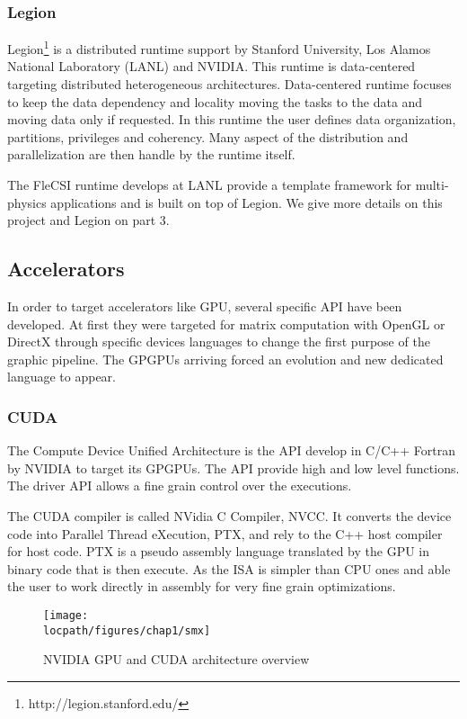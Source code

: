 \subsubsection{Legion}
Legion\footnote{http://legion.stanford.edu/} is a distributed runtime support by Stanford University, Los Alamos National Laboratory (LANL) and NVIDIA. 
This runtime is data-centered targeting distributed heterogeneous architectures. 
Data-centered runtime focuses to keep the data dependency and locality moving the tasks to the data and moving data only if requested. 
In this runtime the user defines data organization, partitions, privileges and coherency. 
Many aspect of the distribution and parallelization are then handle by the runtime itself.

The FleCSI runtime develops at LANL provide a template framework for multi-physics applications and is built on top of Legion. 
We give more details on this project and Legion on part 3.  

\subsection{Accelerators}
In order to target accelerators like GPU, several specific API have been developed. 
At first they were targeted for matrix computation with OpenGL or DirectX through specific devices languages to change the first purpose of the graphic pipeline. 
The GPGPUs arriving forced an evolution and new dedicated language to appear. 

\subsubsection{CUDA}
\label{sec:CUDA}
The Compute Device Unified Architecture is the API develop in C/C++ Fortran by NVIDIA to target its GPGPUs. 
The API provide high and low level functions. 
The driver API allows a fine grain control over the executions.

The CUDA compiler is called NVidia C Compiler, NVCC. 
It converts the device code into Parallel Thread eXecution, PTX, and rely to the C++ host compiler for host code. 
PTX is a pseudo assembly language translated by the GPU in binary code that is then execute. 
As the ISA is simpler than CPU ones and able the user to work directly in assembly for very fine grain optimizations. 

\begin{figure*}[t!]
\centering
\setlength\fboxsep{0pt}
\setlength\fboxrule{0.25pt}
\texttt{[image: \\locpath/figures/chap1/smx]}
\caption{NVIDIA GPU and CUDA architecture overview}
 \label{fig:chap1_gpu}
\end{figure*}

